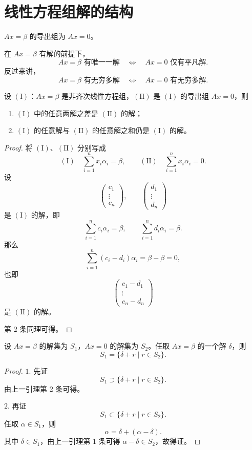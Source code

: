 \section{线性方程组解的结构}

\begin{definition}
	$Ax=\beta$ 的导出组为 $Ax=0$。
	
	
\end{definition}
在 $Ax=\beta$ 有解的前提下，
	\[
	Ax=\beta \text{ 有唯一一解}
	\quad\Longleftrightarrow\quad
	Ax=0 \text{ 仅有平凡解}.
	\]
	反过来讲，
	\[
	Ax=\beta \text{ 有无穷多解}
	\quad\Longleftrightarrow\quad
	Ax=0 \text{ 有无穷多解}.
	\]
\begin{lemma}
	设 $(\mathrm{I})$：$Ax=\beta$ 是非齐次线性方程组，$(\mathrm{II})$ 是 $(\mathrm{I})$ 的导出组 $Ax=0$，则
	\begin{enumerate}
		\item $(\mathrm{I})$ 中的任意两解之差是 $(\mathrm{II})$ 的解；
		\item $(\mathrm{I})$ 的任意解与 $(\mathrm{II})$ 的任意解之和仍是 $(\mathrm{I})$ 的解。
	\end{enumerate}
\end{lemma}
\begin{proof}
	将 $(\mathrm{I})$、$(\mathrm{II})$ 分别写成
	\[
	(\mathrm{I})\quad \sum_{i=1}^n x_i\alpha_i=\beta,
	\qquad
	(\mathrm{II})\quad \sum_{i=1}^n x_i\alpha_i=0.
	\]
	设
	\[
	\begin{pmatrix}
		c_1\\
		\vdots\\
		c_n
	\end{pmatrix},
	\qquad
	\begin{pmatrix}
		d_1\\
		\vdots\\
		d_n
	\end{pmatrix}
	\]
	是 $(\mathrm{I})$ 的解，即
	\[
	\sum_{i=1}^n c_i\alpha_i=\beta,
	\qquad
	\sum_{i=1}^n d_i\alpha_i=\beta.
	\]
	那么
	\[
	\sum_{i=1}^n(c_i-d_i)\alpha_i=\beta-\beta=0,
	\]
	也即
	\[
	\begin{pmatrix}
		c_1-d_1\\
		\vdots\\
		c_n-d_n
	\end{pmatrix}
	\]
	是 $(\mathrm{II})$ 的解。
	
	第 $2$ 条同理可得。
\end{proof}

\begin{corollary}
	设 $Ax=\beta$ 的解集为 $S_1$，$Ax=0$ 的解集为 $S_2$。任取 $Ax=\beta$ 的一个解 $\delta$，则
	\[
	S_1=\{\delta+r\mid r\in S_2\}.
	\]
\end{corollary}
\begin{proof}
	$1.$ 先证
	\[
	S_1\supset \{\delta+r\mid r\in S_2\}.
	\]
	由上一引理第 $2$ 条可得。
	
	$2.$ 再证
	\[
	S_1\subset \{\delta+r\mid r\in S_2\}.
	\]
	任取 $\alpha\in S_1$，则
	\[
	\alpha=\delta+(\alpha-\delta).
	\]
	其中 $\delta\in S_1$，由上一引理第 $1$ 条可得 $\alpha-\delta\in S_2$，故得证。
\end{proof}

